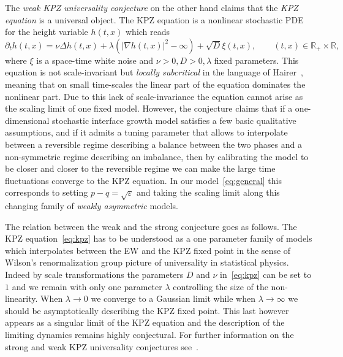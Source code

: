 \documentclass[11pt, a4paper]{article}
\newcommand{\R}{\mathbb{R}}
\newcommand{\1}{\mathbf{1}}
\begin{document}
The \emph{weak KPZ universality conjecture} on the other hand claims that the \emph{KPZ equation} is a universal object. The KPZ equation is a nonlinear stochastic PDE for the height variable $h(t,x)$ which reads
\begin{equation}
\label{eq:kpz}
   \partial_t h(t,x) = \nu \Delta h(t,x) + \lambda (|\nabla h(t,x)|^2 - \infty) + \sqrt{D} \xi(t,x), \qquad (t,x) \in \R_+ \times \R,
\end{equation}
where $\xi$ is a space-time white noise and $\nu>0, D>0, \lambda$ fixed parameters. This equation is not scale-invariant but \emph{locally subcritical} in the language of Hairer~\cite{bib:hairerRegularity}, meaning that on small time-scales the linear part of the equation dominates the nonlinear part. Due to this lack of scale-invariance the equation cannot arise as the scaling limit of one fixed model. However, the conjecture claims that if a one-dimensional stochastic interface growth model satisfies a few basic qualitative assumptions, and if it admits a tuning parameter that allows to interpolate between a reversible regime describing a balance between the two phases and a non-symmetric regime describing an imbalance, then by calibrating the model to be closer and closer to the reversible regime we can make the large time fluctuations converge to the KPZ equation. In our model~\eqref{eq:general} this corresponds to setting $p-q=\sqrt{\varepsilon}$ and taking the scaling limit along this changing family of \emph{weakly asymmetric} models.

The relation between the weak and the strong conjecture goes as follows. The KPZ equation~\eqref{eq:kpz} has to be understood as a one parameter family of models which interpolates between the EW and the KPZ fixed point in the sense of Wilson's renormalization group picture of universality in statistical physics. Indeed by scale transformations the parameters $D$ and $\nu$ in~\eqref{eq:kpz} can be set to $1$ and we remain with only one parameter $\lambda$ controlling the size of the non-linearity. When $\lambda \to 0$ we converge to a Gaussian limit while when $\lambda \to \infty$ we should be asymptotically describing the KPZ fixed point. This last however appears as a singular limit of the KPZ equation and the description of the limiting dynamics remains highly conjectural. For further information on the strong and weak KPZ universality conjectures see~\cite{bib:corwin, bib:quastel, bib:quastelSpohn, bib:spohnSurvey}.
\end{document}
